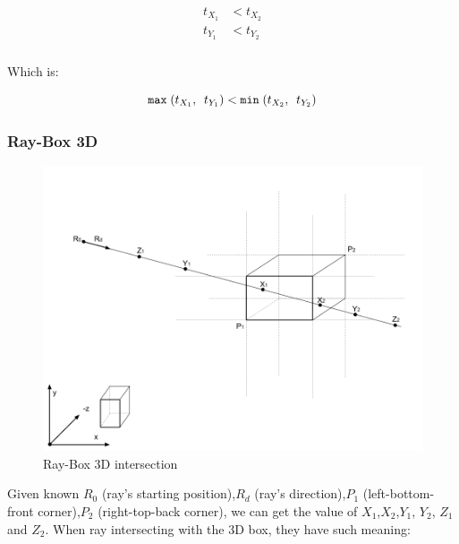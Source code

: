 \[
\begin{array}{lr}
\begin{aligned}
t_{X_1} &< t_{X_2}\\
t_{Y_1} &< t_{Y_2}\\
\end{aligned}
\end{array}
\]

Which is:

\[
\texttt{max}\;(t_{X_1},\enspace t_{Y_1}) < \texttt{min}\;(t_{X_2},\enspace t_{Y_2})
\]

\subsubsection{Ray-Box 3D}

\begin{figure}[H]
\caption{Ray-Box 3D intersection}
\label{fig:ray-box-3d}
\centering
\includegraphics[width=\textwidth, keepaspectratio]{Figures/ray-box-3d-intersection.png}
\decoRule
\end{figure}

Given known $R_0$ (ray's starting position),\enspace$R_d$ (ray's direction),\enspace$P_1$ (left-bottom-front corner),\enspace$P_2$ (right-top-back corner), we can get the value of $X_1$,\enspace$X_2$,\enspace$Y_1$, $Y_2$, $Z_1$ and $Z_2$. When ray intersecting with the 3D box, they have such meaning:

